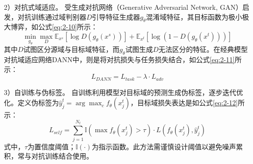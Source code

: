 2）对抗式域适应。
受生成对抗网络（Generative Adversarial Network, GAN）启发，对抗训练通过域判别器$D$引导特征生成器$g_\theta$混淆域特征，其目标函数为极小极大博弈，如公式\eqref{eq:2-10}所示：
\begin{equation}
    \label{eq:2-10}
    \min_{g_\theta} \max_{D} \mathbb{E}_{x^s}[\log D(g_\theta(x^s))] + \mathbb{E}_{x^t}[\log (1 - D(g_\theta(x^t)))]
\end{equation}
其中$D$试图区分源域与目标域特征，而$g_\theta$试图生成$D$无法区分的特征。在经典模型对抗域适应网络DANN中，则是将对抗损失与任务损失结合，如公式\eqref{eq:2-11}所示：
\begin{equation}
    \label{eq:2-11}
    L_{DANN} = L_{task} - \lambda \cdot L_{adv}
\end{equation}

3）自训练与伪标签。
自训练利用模型对目标域的预测生成伪标签，逐步迭代优化。定义伪标签为$\hat{y}_j^t = \arg\max_c f_\theta(x_j^t)$，目标域损失表达是如公式\eqref{eq:2-12}所示：
\begin{equation}
    \label{eq:2-12}
    L_{self} = \sum_{j=1}^{N_t} \mathbb{I}(\max f_\theta(x_j^t) > \tau) \cdot L(f_\theta(x_j^t), \hat{y}_j^t)
\end{equation}
式中，$\tau$为置信度阈值；$\mathbb{I}(\cdot)$为指示函数。此方法需谨慎设计阈值以避免噪声累积，常与对抗训练结合使用。

